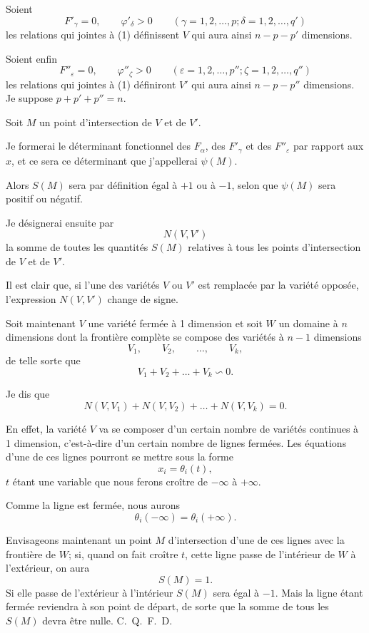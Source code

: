 \documentclass{article}
\begin{document}
Soient
\[
F'_{\gamma} = 0, \qquad \varphi'_{\delta} > 0 \qquad (\gamma = 1, 2, \ldots, p; \delta = 1, 2, \ldots, q') \tag{2}
\]
 les relations qui jointes à (1) définissent $V$ qui aura ainsi $n-p-p'$ dimensions.

Soient enfin
\[
F''_{\varepsilon} = 0, \qquad \varphi''_{\zeta} > 0 \qquad (\varepsilon = 1, 2, \ldots, p''; \zeta = 1, 2, \ldots, q'') \tag{3}
\]
les relations qui jointes à (1) définiront $V'$ qui aura ainsi $n-p-p''$ dimensions. Je suppose $p + p' + p'' = n$.

Soit $M$ un point d'intersection de $V$ et de $V'$.

Je formerai le déterminant fonctionnel des $F_{\alpha}$, des $F'_{\gamma}$ et des $F''_{\varepsilon}$ par rapport aux $x$, et ce sera ce déterminant que j'appellerai $\psi(M)$.

Alors $S(M)$ sera par définition égal à $+1$ ou à $-1$, selon que $\psi(M)$ sera positif ou négatif.

Je désignerai ensuite par
\[
N(V, V')
\]
la somme de toutes les quantités $S(M)$ relatives à tous les points d'intersection de $V$ et de $V'$.

Il est clair que, si l'une des variétés $V$ ou $V'$ est remplacée par la variété opposée, l'expression $N(V, V')$ change de signe.

Soit maintenant $V$ une variété fermée à 1 dimension et soit $W$ un domaine à $n$ dimensions dont la frontière complète se compose des variétés à $n-1$ dimensions
\[
V_{1}, \qquad V_{2}, \qquad \ldots, \qquad V_{k},
\]
de telle sorte que
\[
V_{1} + V_{2} + \ldots + V_{k} \backsim 0.
\]

Je dis que
\[
N(V, V_{1}) + N(V, V_{2}) + \ldots + N(V, V_{k}) = 0.
\]

En effet, la variété $V$ va se composer d'un certain nombre de variétés continues à 1 dimension, c'est-à-dire d'un certain nombre de lignes fermées. Les équations d'une de ces lignes pourront se mettre sous la forme
\[
x_{i} = \theta_{i}(t),
\]
$t$ étant une variable que nous ferons croître de $-\infty$ à $+\infty$.

Comme la ligne est fermée, nous aurons
\[
\theta_{i}(-\infty) = \theta_{i}(+\infty).
\]

Envisageons maintenant un point $M$ d'intersection d'une de ces lignes avec la frontière de $W$; si, quand on fait croître $t$, cette ligne passe de l'intérieur de $W$ à l'extérieur, on aura
\[
S(M) = 1.
\]
Si elle passe de l'extérieur à l'intérieur $S(M)$ sera égal à $-1$. Mais la ligne étant fermée reviendra à son point de départ, de sorte que la somme de tous les $S(M)$ devra être nulle. C.~Q.~F.~D.
\end{document}
